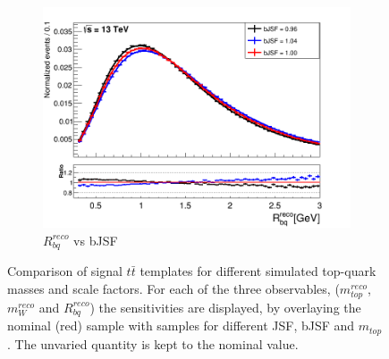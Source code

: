 \begin{landscape}
\begin{figure}
\begin{subfigure}{0.37\textwidth}
	\includegraphics[width=\linewidth]{Pics/PlotCombi/rbq_bJSF.png}
	\caption{$R_{bq}^{reco}$ vs bJSF} \label{fig:RbqbJSF}
\end{subfigure}
	\caption{Comparison of signal $t\bar{t}$ templates for different simulated top-quark masses and scale factors. For each of the three observables, ($m_{top}^{reco}$, $m_{W}^{reco}$ and $R_{bq}^{reco}$) the sensitivities are displayed, by overlaying the nominal (red) sample with samples for different JSF, bJSF and $m_{top}$ . The unvaried quantity is kept to the nominal value. }
\end{figure}\label{fig:Comparison}	
\end{landscape}